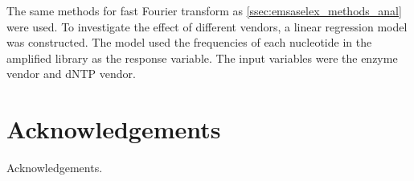 \documentclass[parskip=full, numbers=noenddot]{scrbook}
\begin{document}
The same methods for fast Fourier transform as \ref{ssec:emsaselex_methods_anal} were used.  To investigate the effect of different vendors, a linear regression model was constructed.  The model used the frequencies of each nucleotide in the amplified library as the response variable.  The input variables were the enzyme vendor and dNTP vendor.

\backmatter

\chapter{Acknowledgements}
\label{ch:ack}

Acknowledgements.

\printbibliography
\end{document}
